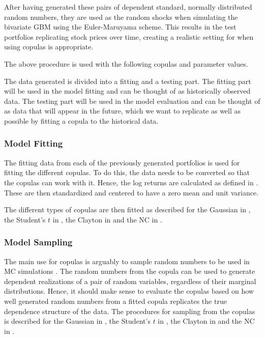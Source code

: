 After having generated these pairs of dependent standard, normally distributed random numbers, they are used as the random shocks when simulating the bivariate \gls{GBM} using the Euler-Maruyama scheme. This results in the test portfolios replicating stock prices over time, creating a realistic setting for when using copulas is appropriate. 

The above procedure is used with the following copulas and parameter values. 

The data generated is divided into a fitting and a testing part. The fitting part will be used in the model fitting and can be thought of as historically observed data. The testing part will be used in the model evaluation and can be thought of as data that will appear in the future, which we want to replicate as well as possible by fitting a copula to the historical data. 

\subsubsection{Model Fitting}
The fitting data from each of the previously generated portfolios is used for fitting the different copulas. To do this, the data needs to be converted so that the copulas can work with it. Hence, the log returns are calculated as defined in . These are then standardized and centered to have a zero mean and unit variance. 

The different types of copulas are then fitted as described for the Gaussian in , the Student's $t$ in , the Clayton in  and the \gls{NC} in . 


\subsubsection{Model Sampling}
The main use for copulas is arguably to sample random numbers to be used in \gls{MC} simulations . The random numbers from the copula can be used to generate dependent realizations of a pair of random variables, regardless of their marginal distributions. Hence, it should make sense to evaluate the copulas based on how well generated random numbers from a fitted copula replicates the true dependence structure of the data. The procedures for sampling from the copulas is described for the Gaussian in , the Student's $t$ in , the Clayton in  and the \gls{NC} in . 

